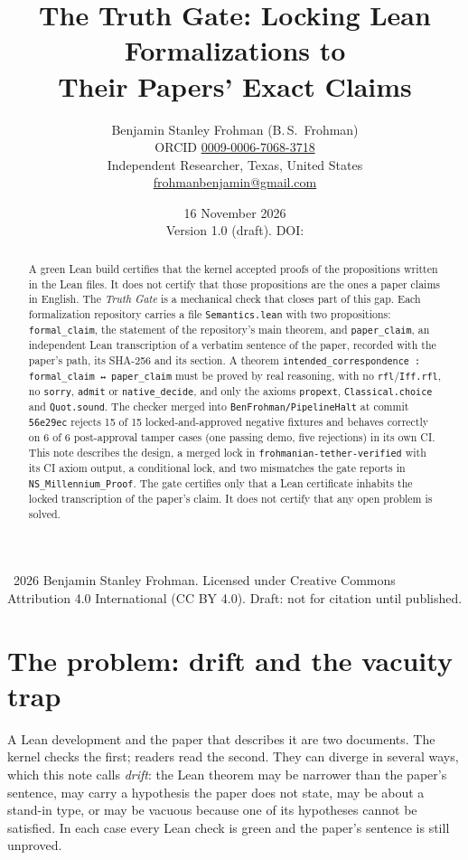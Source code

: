 \documentclass[11pt,a4paper]{article}
\title{The Truth Gate: Locking Lean Formalizations to\\ Their Papers' Exact Claims}
\author{Benjamin Stanley Frohman (B.\,S.\ Frohman)\\
\small ORCID \href{https://orcid.org/0009-0006-7068-3718}{0009-0006-7068-3718}\\
\small Independent Researcher, Texas, United States\\
\small \href{mailto:frohmanbenjamin@gmail.com}{frohmanbenjamin@gmail.com}}
\date{16 November 2026\\[2pt]\small Version 1.0 (draft). DOI: \reserveddoi}
\newcommand{\code}[1]{\texttt{#1}}
\begin{document}
\maketitle

\begin{abstract}
A green Lean build certifies that the kernel accepted proofs of the propositions written in the
Lean files. It does not certify that those propositions are the ones a paper claims in English.
The \emph{Truth Gate} is a mechanical check that closes part of this gap. Each formalization
repository carries a file \code{Semantics.lean} with two propositions: \code{formal\_claim}, the
statement of the repository's main theorem, and \code{paper\_claim}, an independent Lean
transcription of a verbatim sentence of the paper, recorded with the paper's path, its SHA-256
and its section. A theorem \code{intended\_correspondence : formal\_claim ↔ paper\_claim} must be
proved by real reasoning, with no \code{rfl}/\code{Iff.rfl}, no \code{sorry}, \code{admit} or
\code{native\_decide}, and only the axioms \code{propext}, \code{Classical.choice} and
\code{Quot.sound}. The checker merged into \code{BenFrohman/PipelineHalt} at commit
\code{56e29ec} rejects 15 of 15 locked-and-approved negative fixtures and behaves correctly on
6 of 6 post-approval tamper cases (one passing demo, five rejections) in its own CI. This note
describes the design, a merged lock in \code{frohmanian-tether-verified} with its CI axiom
output, a conditional lock, and two mismatches the gate reports in \code{NS\_Millennium\_Proof}.
The gate certifies only that a Lean certificate inhabits the locked transcription of the paper's
claim. It does not certify that any open problem is solved.
\end{abstract}

\noindent\small\textcopyright\ 2026 Benjamin Stanley Frohman. Licensed under Creative Commons
Attribution 4.0 International (CC BY 4.0). Draft: not for citation until published.\normalsize

\section{The problem: drift and the vacuity trap}

A Lean development and the paper that describes it are two documents. The kernel checks the
first; readers read the second. They can diverge in several ways, which this note calls
\emph{drift}: the Lean theorem may be narrower than the paper's sentence, may carry a
hypothesis the paper does not state, may be about a stand-in type, or may be vacuous because one
of its hypotheses cannot be satisfied. In each case every Lean check is green and the paper's
sentence is still unproved.
\end{document}
